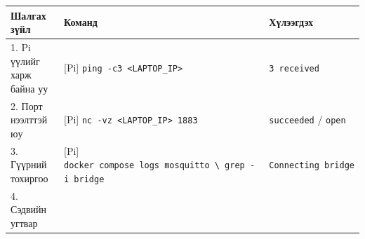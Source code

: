 \begingroup\scriptsize\begin{longtable}[]{@{}lll@{}}
\toprule
\begin{minipage}[b]{0.30\columnwidth}\raggedright
Шалгах зүйл\strut
\end{minipage} & \begin{minipage}[b]{0.30\columnwidth}\raggedright
Команд\strut
\end{minipage} & \begin{minipage}[b]{0.30\columnwidth}\raggedright
Хүлээгдэх\strut
\end{minipage}\tabularnewline
\midrule
\endhead
\begin{minipage}[t]{0.30\columnwidth}\raggedright
1. Pi үүлийг харж байна уу\strut
\end{minipage} & \begin{minipage}[t]{0.30\columnwidth}\raggedright
{[}Pi{]} \texttt{ping\ -c3\ \textless{}LAPTOP\_\allowbreak{}IP\textgreater{}}\strut
\end{minipage} & \begin{minipage}[t]{0.30\columnwidth}\raggedright
\texttt{3\ received}\strut
\end{minipage}\tabularnewline
\begin{minipage}[t]{0.30\columnwidth}\raggedright
2. Порт нээлттэй юу\strut
\end{minipage} & \begin{minipage}[t]{0.30\columnwidth}\raggedright
{[}Pi{]} \texttt{nc\ -vz\ \textless{}LAPTOP\_\allowbreak{}IP\textgreater{}\ 1883}\strut
\end{minipage} & \begin{minipage}[t]{0.30\columnwidth}\raggedright
\texttt{succeeded} / \texttt{open}\strut
\end{minipage}\tabularnewline
\begin{minipage}[t]{0.30\columnwidth}\raggedright
3. Гүүрний тохиргоо\strut
\end{minipage} & \begin{minipage}[t]{0.30\columnwidth}\raggedright
{[}Pi{]} \texttt{docker\ compose\ logs\ mosquitto\ \textbackslash{}\textbar{}\ grep\ -i\ bridge}\strut
\end{minipage} & \begin{minipage}[t]{0.30\columnwidth}\raggedright
\texttt{Connecting\ bridge}\strut
\end{minipage}\tabularnewline
\begin{minipage}[t]{0.30\columnwidth}\raggedright
4. Сэдвийн угтвар\strut
\end{minipage} & \begin{minipage}[t]{0.30\columnwidth}\raggedright

\end{minipage}
\end{longtable}
